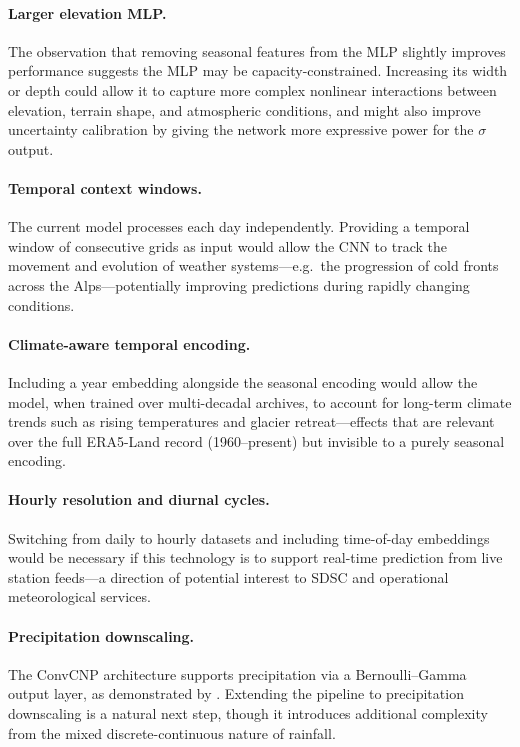 \paragraph{Larger elevation MLP.}
The observation that removing seasonal features from the MLP slightly improves performance suggests the MLP may be capacity-constrained. Increasing its width or depth could allow it to capture more complex nonlinear interactions between elevation, terrain shape, and atmospheric conditions, and might also improve uncertainty calibration by giving the network more expressive power for the $\sigma$ output.

\paragraph{Temporal context windows.}
The current model processes each day independently. Providing a temporal window of consecutive grids as input would allow the CNN to track the movement and evolution of weather systems---e.g.\ the progression of cold fronts across the Alps---potentially improving predictions during rapidly changing conditions.

\paragraph{Climate-aware temporal encoding.}
Including a year embedding alongside the seasonal encoding would allow the model, when trained over multi-decadal archives, to account for long-term climate trends such as rising temperatures and glacier retreat---effects that are relevant over the full ERA5-Land record (1960--present) but invisible to a purely seasonal encoding.

\paragraph{Hourly resolution and diurnal cycles.}
Switching from daily to hourly datasets and including time-of-day embeddings would be necessary if this technology is to support real-time prediction from live station feeds---a direction of potential interest to SDSC and operational meteorological services.

\paragraph{Precipitation downscaling.}
The ConvCNP architecture supports precipitation via a Bernoulli--Gamma output layer, as demonstrated by \citet{vaughan2022}. Extending the pipeline to precipitation downscaling is a natural next step, though it introduces additional complexity from the mixed discrete-continuous nature of rainfall.

